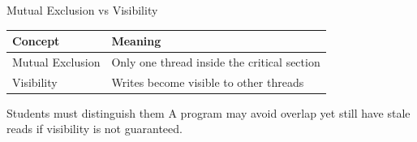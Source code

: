 \documentclass[aspectratio=169,11pt]{beamer}
\begin{document}
	\begin{frame}{Mutual Exclusion vs Visibility}
		\centering
		\begin{tabular}{@{}ll@{}}
			\toprule
			\textbf{Concept} & \textbf{Meaning} \\
			\midrule
			Mutual Exclusion & Only one thread inside the critical section \\
			Visibility & Writes become visible to other threads \\
			\bottomrule
		\end{tabular}
		
		\bigskip
		
		\begin{alertblock}{Students must distinguish them}
			A program may avoid overlap yet still have stale reads if visibility is not guaranteed.
		\end{alertblock}
	\end{frame}
	
\end{document}
